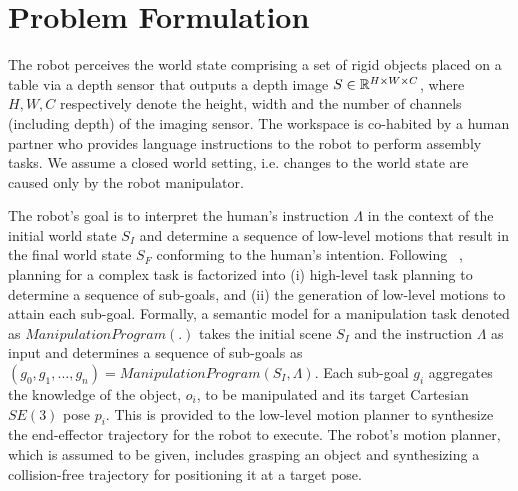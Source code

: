 \section{Problem Formulation}\label{sec:problem}
The robot perceives the world state comprising a set of rigid objects placed on a table via a depth sensor that outputs a depth image $S \in \mathbb{R}^{H\times W \times C}$, where $H,W,C$ respectively
denote the height, width and the number of channels (including depth) of the imaging sensor.  
%
%
%
The workspace is co-habited by a human partner 
who provides language instructions 
%
to the robot to perform assembly tasks.
We assume a closed world setting, i.e. changes to the world state are caused only by the robot manipulator. 

The robot's goal is to interpret the human's instruction $\Lambda$ 
in the context of the initial world state $S_I$ and determine a 
sequence of low-level  motions that result in the final world state 
$S_F$ conforming to the human's intention.  
%
%
Following ~\cite{kaelbling2010hierarchical, zhu2020hierarchical}, 
planning for a complex task is factorized into  (i) high-level task planning to determine a sequence of sub-goals, and (ii) the generation of 
low-level motions to attain each sub-goal. 
%
Formally, a semantic model for a manipulation task denoted as $ManipulationProgram(.)$ takes the initial scene $S_I$ and the instruction $\Lambda$ as input and determines a sequence of 
sub-goals as $(g_0, g_1, \dots, g_n) = ManipulationProgram(S_I, \Lambda)$. 
%
Each sub-goal $g_i$ aggregates the 
knowledge of the object, $o_i$, to be manipulated 
and its target Cartesian $SE(3)$ pose $p_i$. This is  
provided to the low-level motion planner 
to synthesize the end-effector trajectory for the robot to execute. 
%
The robot's motion planner, which is assumed to be given, includes grasping an object  
and synthesizing a collision-free trajectory for positioning it at a target pose. 
%
%


